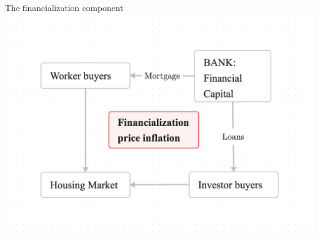 \documentclass[]{beamer} %
\begin{document}
\note[enumerate]{\item }{}



\begin{frame}{The financialization component}
\centering
\includegraphics[scale=.175]{fig/flow-financialization.png}
\end{frame}
\end{document}

